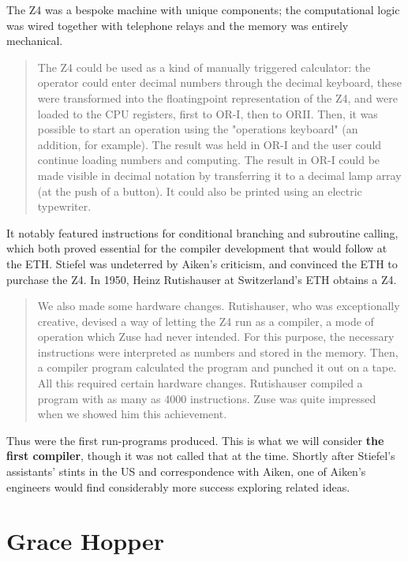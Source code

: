 The Z4 was a bespoke machine with unique components; the computational logic was wired together with
telephone relays and the memory was entirely mechanical.

\begin{quotation}
The Z4 could be used as a kind of manually triggered calculator: the operator 
could enter decimal numbers through the decimal keyboard, these were 
transformed into the floatingpoint representation of the Z4, and were loaded to 
the CPU registers, first to OR-I, then to ORII. Then, it was possible to start 
an operation using the "operations keyboard" (an addition, for example). The 
result was held in OR-I and the user could continue loading numbers and 
computing. The result in OR-I could be made visible in decimal notation by 
transferring it to a decimal lamp array (at the push of a button). It could 
also be printed using an electric typewriter. \cite{architecture-of-konrad-zuses-z4-computer-2021}
\end{quotation}

It notably featured instructions for conditional branching and subroutine calling, which
both proved essential for the compiler development that would follow at the ETH.
Stiefel was undeterred by Aiken's criticism, and convinced the ETH to purchase the Z4.
In 1950, Heinz Rutishauser at Switzerland's ETH obtains a Z4.

\begin{quotation}
We also made some hardware changes. Rutishauser, who was exceptionally creative, devised a way of
letting the Z4 run as a compiler, a mode of operation which Zuse had never intended. For this purpose, the
necessary instructions were interpreted as numbers and stored in the memory. Then, a compiler program
calculated the program and punched it out on a tape. All this required certain hardware changes. Rutishauser
compiled a program with as many as 4000 instructions. Zuse was quite impressed when we showed him this
achievement.\cite{konrad-zuses-z4-2000}
\end{quotation}

Thus were the first run-programs produced.
This is what we will consider \textbf{the first compiler}, though it was not called that at the time.
Shortly after Stiefel's assistants' stints in the US and correspondence with Aiken,
one of Aiken's engineers would find considerably more success exploring related ideas.

\section{Grace Hopper}

